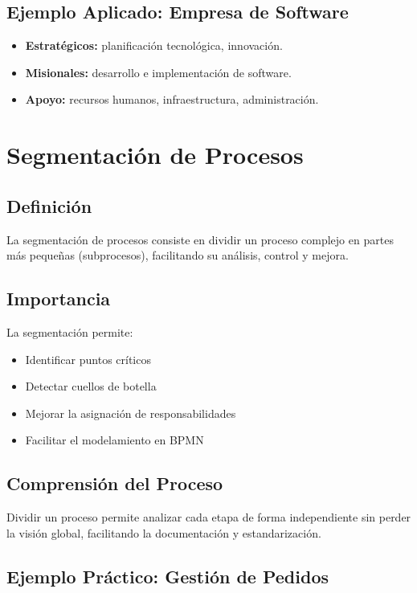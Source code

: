 \documentclass[12pt,a4paper]{article}
\begin{document}
\subsection{Ejemplo Aplicado: Empresa de Software}
\begin{itemize}
    \item \textbf{Estratégicos:} planificación tecnológica, innovación.
    \item \textbf{Misionales:} desarrollo e implementación de software.
    \item \textbf{Apoyo:} recursos humanos, infraestructura, administración.
\end{itemize}

\section{Segmentación de Procesos}

\subsection{Definición}
La segmentación de procesos consiste en dividir un proceso complejo en partes más pequeñas (subprocesos), facilitando su análisis, control y mejora.

\subsection{Importancia}
La segmentación permite:

\begin{itemize}
    \item Identificar puntos críticos
    \item Detectar cuellos de botella
    \item Mejorar la asignación de responsabilidades
    \item Facilitar el modelamiento en BPMN
\end{itemize}

\subsection{Comprensión del Proceso}
Dividir un proceso permite analizar cada etapa de forma independiente sin perder la visión global, facilitando la documentación y estandarización.

\subsection{Ejemplo Práctico: Gestión de Pedidos}
\end{document}
